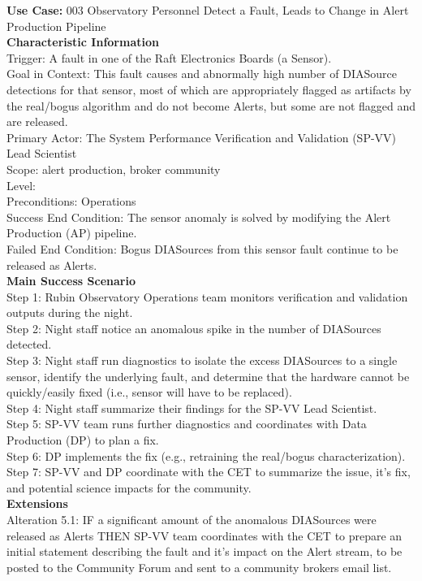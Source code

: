 {\bf Use Case:} 003 Observatory Personnel Detect a Fault, Leads to Change in Alert Production Pipeline \\

{\bf Characteristic Information} \\
Trigger: A fault in one of the Raft Electronics Boards (a \gls{Sensor}). \\
Goal in Context: This fault causes and abnormally high number of \gls{DIASource} detections for that sensor, most of which are appropriately flagged as artifacts by the real/bogus algorithm and do not become Alerts, but some are not flagged and are released. \\
Primary Actor: The System Performance Verification and Validation (SP-VV) Lead Scientist \\
Scope: alert production, broker community \\
Level: \\
Preconditions: Operations \\
Success End Condition: The sensor anomaly is solved by modifying the Alert Production (AP) pipeline. \\
Failed End Condition: Bogus DIASources from this sensor fault continue to be released as Alerts. \\

{\bf Main Success Scenario} \\
Step 1: Rubin Observatory Operations team monitors verification and validation outputs during the night. \\
Step 2: Night staff notice an anomalous spike in the number of DIASources detected. \\
Step 3: Night staff run diagnostics to isolate the excess DIASources to a single sensor, identify the underlying fault, and determine that the hardware cannot be quickly/easily fixed (i.e., sensor will have to be replaced). \\
Step 4: Night staff summarize their findings for the SP-VV Lead Scientist. \\
Step 5: SP-VV team runs further diagnostics and coordinates with Data Production (DP) to plan a fix. \\
Step 6: DP implements the fix (e.g., retraining the real/bogus characterization). \\
Step 7: SP-VV and DP coordinate with the CET to summarize the issue, it's fix, and potential science impacts for the community. \\

{\bf Extensions} \\
Alteration 5.1: IF a significant amount of the anomalous DIASources were released as Alerts THEN SP-VV team coordinates with the CET to prepare an initial statement describing the fault and it's impact on the Alert stream, to be posted to the Community Forum and sent to a community brokers email list. \\

